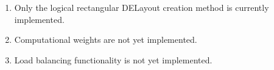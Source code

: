 

\begin{enumerate}

\item Only the logical rectangular DELayout creation method is currently implemented.

\item Computational weights are not yet implemented. 

\item Load balancing functionality is not yet implemented.

\end{enumerate}


